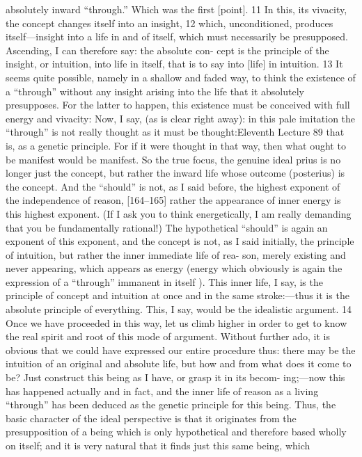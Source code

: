 absolutely inward “through.” Which was the first [point]. 11
In this, its vivacity, the concept changes itself into an insight, 12 which,
unconditioned, produces itself—insight into a life in and of itself, which must
necessarily be presupposed. Ascending, I can therefore say: the absolute con-
cept is the principle of the insight, or intuition, into life in itself, that is to say
into [life] in intuition. 13 It seems quite possible, namely in a shallow and faded
way, to think the existence of a “through” without any insight arising into the
life that it absolutely presupposes. For the latter to happen, this existence must
be conceived with full energy and vivacity: Now, I say, (as is clear right away):
in this pale imitation the “through” is not really thought as it must be thought:Eleventh Lecture
89
that is, as a genetic principle. For if it were thought in that way, then what
ought to be manifest would be manifest. So the true focus, the genuine ideal
prius is no longer just the concept, but rather the inward life whose outcome
(posterius) is the concept. And the “should” is not, as I said before, the highest
exponent of the independence of reason, [164–165] rather the appearance of
inner energy is this highest exponent. (If I ask you to think energetically, I am
really demanding that you be fundamentally rational!) The hypothetical
“should” is again an exponent of this exponent, and the concept is not, as I said
initially, the principle of intuition, but rather the inner immediate life of rea-
son, merely existing and never appearing, which appears as energy (energy
which obviously is again the expression of a “through” immanent in itself ).
This inner life, I say, is the principle of concept and intuition at once and in
the same stroke:—thus it is the absolute principle of everything. This, I say,
would be the idealistic argument. 14
Once we have proceeded in this way, let us climb higher in order to get
to know the real spirit and root of this mode of argument. Without further
ado, it is obvious that we could have expressed our entire procedure thus: there
may be the intuition of an original and absolute life, but how and from what
does it come to be? Just construct this being as I have, or grasp it in its becom-
ing;—now this has happened actually and in fact, and the inner life of reason
as a living “through” has been deduced as the genetic principle for this being.
Thus, the basic character of the ideal perspective is that it originates from the
presupposition of a being which is only hypothetical and therefore based
wholly on itself; and it is very natural that it finds just this same being, which
